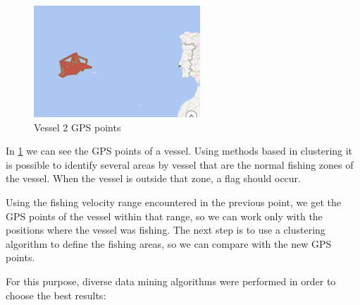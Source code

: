 \begin{figure}[H]
    \centering
    \includegraphics[width=0.8\linewidth]{Chapters/img/gps_vessel2.png}
    \caption{Vessel 2 GPS points}
    \label{fig:gps_vessel2}
\end{figure}

In \ref{fig:gps_vessel2} we can see the GPS points of a vessel. Using methods based in clustering it is possible to identify several areas by vessel that are the normal fishing zones of the vessel. When the vessel is outside that zone, a flag should occur.

Using the fishing velocity range encountered in the previous point, we get the GPS points of the vessel within that range, so we can work only with the positions where the vessel was fishing. The next step is to use a clustering algorithm to define the fishing areas, so we can compare with the new GPS points. 

For this purpose, diverse data mining algorithms were performed in order to choose the best results:

